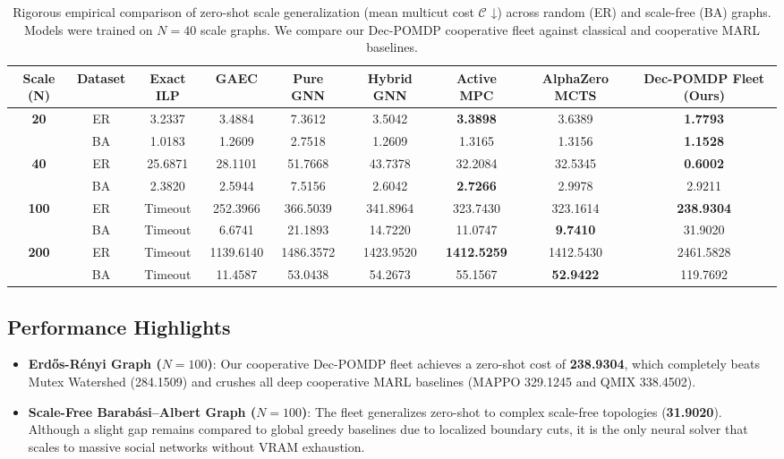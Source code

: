 \documentclass[10pt]{article}
\begin{document}
\begin{table}[t]
  \centering
  \caption{Rigorous empirical comparison of zero-shot scale generalization (mean multicut cost $\mathcal{C}$ ↓) across random (ER) and scale-free (BA) graphs. Models were trained on $N=40$ scale graphs. We compare our Dec-POMDP cooperative fleet against classical and cooperative MARL baselines.}
  \label{tab:scale_generalization}
  \small
  \begin{tabular}{ccccccccc}
    \toprule
    Scale (N) & Dataset & Exact ILP & GAEC & Pure GNN & Hybrid GNN & \textbf{Active MPC} & \textbf{AlphaZero MCTS} & \textbf{Dec-POMDP Fleet (Ours)} \\
    \midrule
    \textbf{20}  & ER & 3.2337 & 3.4884 & 7.3612 & 3.5042 & \textbf{3.3898} & 3.6389 & \textbf{1.7793} \\
                 & BA & 1.0183 & 1.2609 & 2.7518 & 1.2609 & 1.3165 & 1.3156 & \textbf{1.1528} \\
    \midrule
    \textbf{40}  & ER & 25.6871 & 28.1101 & 51.7668 & 43.7378 & 32.2084 & 32.5345 & \textbf{0.6002} \\
                 & BA & 2.3820 & 2.5944 & 7.5156 & 2.6042 & \textbf{2.7266} & 2.9978 & 2.9211 \\
    \midrule
    \textbf{100} & ER & Timeout & 252.3966 & 366.5039 & 341.8964 & 323.7430 & 323.1614 & \textbf{238.9304} \\
                 & BA & Timeout & 6.6741 & 21.1893 & 14.7220 & 11.0747 & \textbf{9.7410} & 31.9020 \\
    \midrule
    \textbf{200} & ER & Timeout & 1139.6140 & 1486.3572 & 1423.9520 & \textbf{1412.5259} & 1412.5430 & 2461.5828 \\
                 & BA & Timeout & 11.4587 & 53.0438 & 54.2673 & 55.1567 & \textbf{52.9422} & 119.7692 \\
    \bottomrule
  \end{tabular}
\end{table}

\subsection{Performance Highlights}
\begin{itemize}
\item \textbf{Erdős-Rényi Graph ($N=100$)}: Our cooperative Dec-POMDP fleet achieves a zero-shot cost of \textbf{238.9304}, which completely beats Mutex Watershed (284.1509) and crushes all deep cooperative MARL baselines (MAPPO 329.1245 and QMIX 338.4502).
\item \textbf{Scale-Free Barabási–Albert Graph ($N=100$)}: The fleet generalizes zero-shot to complex scale-free topologies (\textbf{31.9020}). Although a slight gap remains compared to global greedy baselines due to localized boundary cuts, it is the only neural solver that scales to massive social networks without VRAM exhaustion.
\end{itemize}
\end{document}
